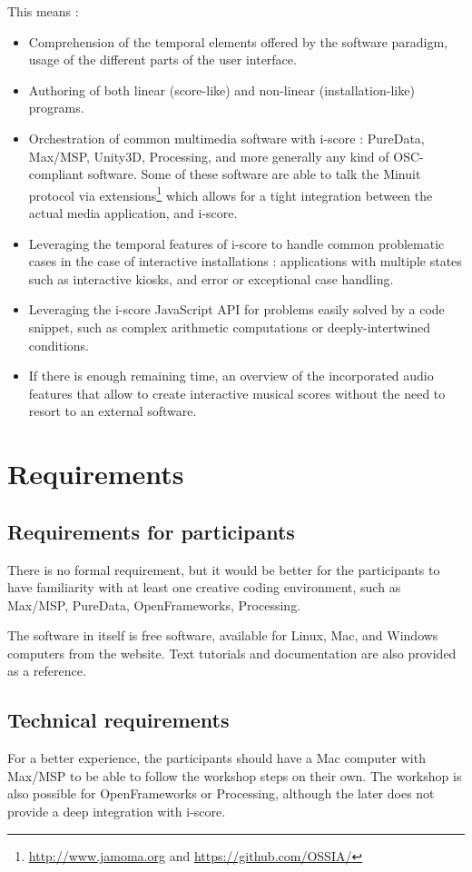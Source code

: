 \documentclass[11pt]{article}
\begin{document}
This means : 
\begin{itemize}
	\item Comprehension of the temporal elements offered by the software paradigm, usage of the different parts of the user interface.
	\item Authoring of both linear (score-like) and non-linear (installation-like) programs.
	\item Orchestration of common multimedia software with i-score : PureData, Max/MSP, Unity3D, Processing, and more generally any kind of OSC-compliant software.
	Some of these software are able to talk the Minuit protocol via extensions\footnote{\url{http://www.jamoma.org} and \url{https://github.com/OSSIA/}} which allows for a tight integration between the actual media application, and i-score.
	\item Leveraging the temporal features of i-score to handle common problematic cases in the case of interactive installations : applications with multiple states such as interactive kiosks, and error or exceptional case handling.
	\item Leveraging the i-score JavaScript API for problems easily solved by a code snippet, such as complex arithmetic computations or deeply-intertwined conditions.
	\item If there is enough remaining time, an overview of the incorporated audio features that allow to create interactive musical scores without the need to resort to an external software.
\end{itemize}

\section*{Requirements}
\subsection*{Requirements for participants}
There is no formal requirement, but it would be better for the 
participants to have familiarity with at least one creative coding environment, 
such as Max/MSP, PureData, OpenFrameworks, Processing.

The software in itself is free software, available for Linux, Mac, and Windows computers from the website.
Text tutorials and documentation are also provided as a reference.

\subsection*{Technical requirements}
For a better experience, the participants should have a Mac computer with Max/MSP to be able to follow the workshop steps on their own. The workshop is also possible for OpenFrameworks or Processing, although the later does not provide a deep integration with i-score.
\end{document}
